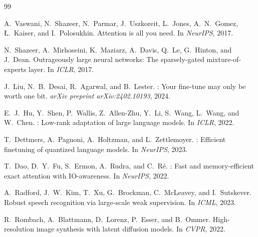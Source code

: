 \documentclass[11pt,a4paper]{article}
\begin{document}
\begin{thebibliography}{99}

A.~Vaswani, N.~Shazeer, N.~Parmar, J.~Uszkoreit, L.~Jones, A.~N.~Gomez,
\L.~Kaiser, and I.~Polosukhin.
\newblock Attention is all you need.
\newblock In \emph{NeurIPS}, 2017.

N.~Shazeer, A.~Mirhoseini, K.~Maziarz, A.~Davis, Q.~Le, G.~Hinton, and
J.~Dean.
\newblock Outrageously large neural networks: The sparsely-gated
mixture-of-experts layer.
\newblock In \emph{ICLR}, 2017.

J.~Liu, N.~B.~Desai, R.~Agarwal, and B.~Lester.
: Your fine-tune may only be worth one bit.
\newblock \emph{arXiv preprint arXiv:2402.10193}, 2024.

E.~J.~Hu, Y.~Shen, P.~Wallis, Z.~Allen-Zhu, Y.~Li, S.~Wang, L.~Wang, and
W.~Chen.
: Low-rank adaptation of large language models.
\newblock In \emph{ICLR}, 2022.

T.~Dettmers, A.~Pagnoni, A.~Holtzman, and L.~Zettlemoyer.
: Efficient finetuning of quantized language models.
\newblock In \emph{NeurIPS}, 2023.

T.~Dao, D.~Y.~Fu, S.~Ermon, A.~Rudra, and C.~R\'e.
: Fast and memory-efficient exact attention with
{IO}-awareness.
\newblock In \emph{NeurIPS}, 2022.

A.~Radford, J.~W.~Kim, T.~Xu, G.~Brockman, C.~McLeavey, and I.~Sutskever.
\newblock Robust speech recognition via large-scale weak supervision.
\newblock In \emph{ICML}, 2023.

R.~Rombach, A.~Blattmann, D.~Lorenz, P.~Esser, and B.~Ommer.
\newblock High-resolution image synthesis with latent diffusion models.
\newblock In \emph{CVPR}, 2022.

\end{thebibliography}
\end{document}
